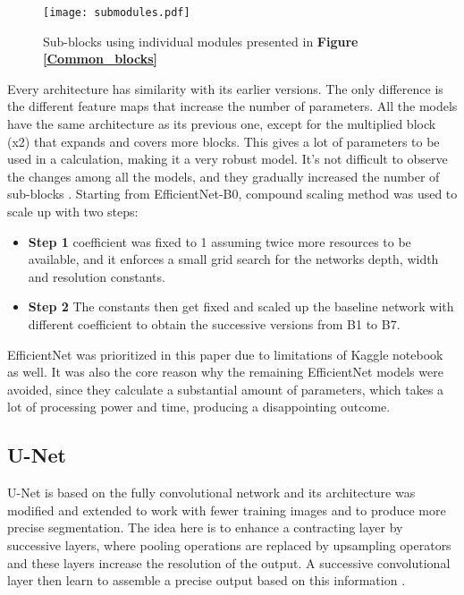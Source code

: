 \documentclass[conference]{IEEEtran}
\begin{document}
\begin{figure}[h!]
    \centering
    \texttt{[image: submodules.pdf]}
    \caption{Sub-blocks using individual modules presented in \textbf{Figure \ref{Common_blocks}}}
    \label{submodules}
\end{figure}





Every architecture has similarity with its earlier versions. The only difference is the different feature maps that increase the number of parameters. All the models have the same architecture as its previous one, except for the multiplied block (x2) that expands and covers more blocks. This gives a lot of parameters to be used in a calculation, making it a very robust model.
It’s not difficult to observe the changes among all the models, and they gradually increased the number of sub-blocks \cite{tan2019efficientnet}. Starting from EfficientNet-B0, compound scaling method was used to scale up with two steps:
\begin{itemize}
    \item \textbf{Step 1} coefficient was fixed to 1 assuming twice more resources to be available, and it enforces a small grid search for the networks depth, width and resolution constants.
    \item \textbf{Step 2} The constants then get fixed and scaled up the baseline network with different coefficient to obtain the successive versions from B1 to B7.
\end{itemize}



EfficientNet was prioritized in this paper due to limitations of Kaggle notebook as well. It was also the core reason why the remaining EfficientNet models were avoided, since they calculate a substantial amount of parameters, which takes a lot of processing power and time, producing a disappointing outcome.


\subsection{U-Net}
U-Net is based on the fully convolutional network and its architecture was modified and extended to work with fewer training images and to produce more precise segmentation. The idea here is to enhance a contracting layer by successive layers, where pooling operations are replaced by upsampling operators and these layers increase the resolution of the output. A successive convolutional layer then learn to assemble a precise output based on this information \cite{ronneberger2015u}.
\end{document}
